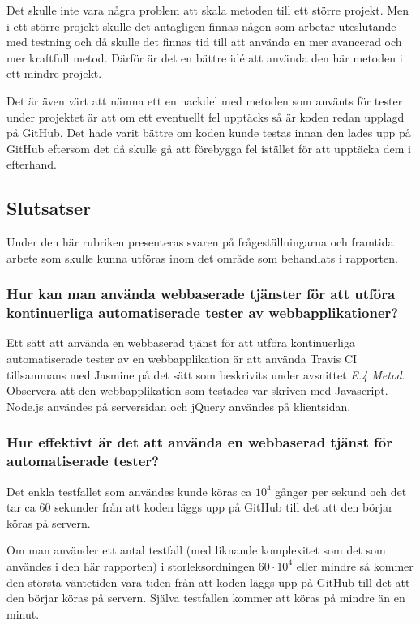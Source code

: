 Det skulle inte vara några problem att skala metoden till ett större projekt.
Men i ett större projekt skulle det antagligen finnas någon som arbetar
uteslutande med testning och då skulle det finnas tid till att använda en
mer avancerad och mer kraftfull metod. Därför är det en bättre idé att 
använda den här metoden i ett mindre projekt.

Det är även värt att nämna ett en nackdel med metoden som använts för tester
under projektet
är att om ett eventuellt fel upptäcks så är koden redan upplagd på GitHub.
Det hade varit bättre om koden kunde testas innan den lades upp på GitHub
eftersom det då skulle gå att förebygga fel istället för att upptäcka 
dem i efterhand.

\subsection{Slutsatser}
Under den här rubriken presenteras svaren på
frågeställningarna och framtida arbete som skulle
kunna utföras inom det område som behandlats i rapporten.

\subsubsection{Hur kan man använda webbaserade tjänster för
att utföra kontinuerliga automatiserade tester av webbapplikationer?}
Ett sätt att använda en webbaserad tjänst för att utföra kontinuerliga 
automatiserade tester av en webbapplikation är att använda  
Travis CI tillsammans med Jasmine på det sätt som beskrivits
under avsnittet \emph{E.4 Metod}. Observera att den webbapplikation som testades
var skriven med Javascript. Node.js användes på serversidan och 
jQuery användes på klientsidan.

\subsubsection{Hur effektivt är det att använda en webbaserad tjänst
för automatiserade tester?}
Det enkla testfallet som användes kunde köras ca $10^4$ gånger per sekund och
det tar ca 60 sekunder från att koden läggs upp på GitHub till det att den
börjar köras på servern.

Om man använder ett antal testfall (med liknande komplexitet som
det som användes i den här rapporten) i storleksordningen $60 \cdot 10^4$ eller
mindre så kommer den största väntetiden vara tiden från att koden
läggs upp på GitHub till det att den börjar köras på servern. Själva
testfallen kommer att köras på mindre än en minut.

